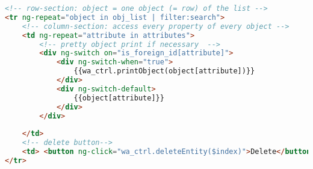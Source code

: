 \scriptsize
\begin{lstlisting}[caption=index.html, label=cs:input_form, language=HTML]
<!-- row-section: object = one object (= row) of the list -->
<tr ng-repeat="object in obj_list | filter:search">
	<!-- column-section: access every property of every object -->
	<td ng-repeat="attribute in attributes">
		<!-- pretty object print if necessary  -->
		<div ng-switch on="is_foreign_id[attribute]">
			<div ng-switch-when="true">
				{{wa_ctrl.printObject(object[attribute])}}
			</div>
			<div ng-switch-default>
				{{object[attribute]}}
			</div>
		</div>
	
	</td>
	<!-- delete button-->
	<td> <button ng-click="wa_ctrl.deleteEntity($index)">Delete</button> </td>
</tr>
\end{lstlisting}
\normalsize 

